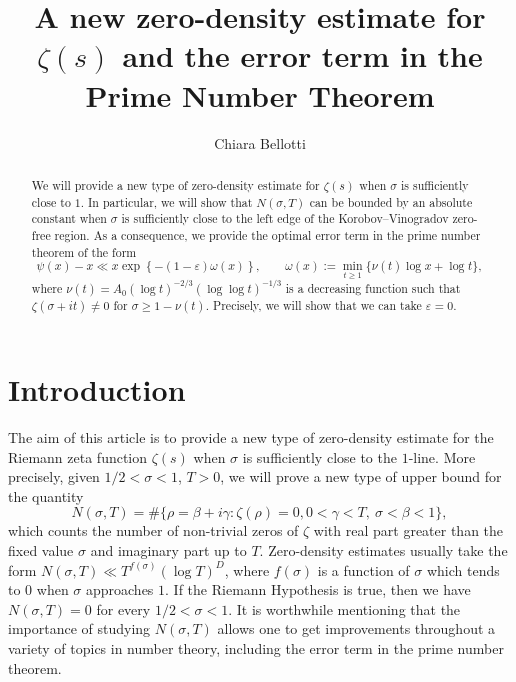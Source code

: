 \documentclass[reqno]{amsart}
\title[A new zero-density estimate and PNT]{A new zero-density estimate for $\zeta(s)$ and the error term in the Prime Number Theorem}
\author[C. Bellotti]{Chiara  Bellotti}
\numberwithin{equation}{section}
\theoremstyle{remark}
\begin{document}
\maketitle
\vspace{-2.5em}
\begin{abstract}
We will provide a new type of zero-density estimate for $\zeta(s)$ when $\sigma$ is sufficiently close to $1$. In particular, we will show that $N(\sigma,T)$ can be bounded by an absolute constant when $\sigma$ is sufficiently close to the left edge of the Korobov--Vinogradov zero-free region. As a consequence, we provide the optimal error term in the prime number theorem of the form 
$$
\psi(x)-x \ll x\exp \left\{-(1-\varepsilon) \omega(x)\right\},\qquad \omega(x):=\min _{t \geq 1}\{\nu(t) \log x+\log t\},
$$
where $\nu(t)=A_0(\log t)^{-2/3}(\log\log t)^{-1/3}$ is a decreasing function such that $\zeta(\sigma+it)\neq 0$ for $\sigma\ge 1-\nu(t)$. Precisely, we will show that we can take $\varepsilon=0$.
\end{abstract}
\section{Introduction}\label{section1}
The aim of this article is to provide a new type of zero-density estimate for the Riemann zeta function $\zeta(s)$ when $\sigma$ is sufficiently close to the $1$-line. More precisely, given $1/2<\sigma<1$, $T>0$, we will prove a new type of upper bound for the quantity$$
N(\sigma, T)=\#\{\rho=\beta+i \gamma: \zeta(\rho)=0,0<\gamma<T,\  \sigma<\beta<1\},
$$
which counts the number of non-trivial zeros of $\zeta$ with real part greater than the fixed value $\sigma$ and imaginary part up to $T$. Zero-density estimates usually take the form $N(\sigma,T)\ll T^{f(\sigma)}(\log T)^{D}$, where $f(\sigma)$ is a function of $\sigma$ which tends to $0$ when $\sigma$ approaches $1$. If the Riemann Hypothesis is true, then we have $N(\sigma,T)=0$ for every $1/2<\sigma<1$. It is worthwhile mentioning that the importance of studying $N(\sigma,T)$ allows one to get improvements throughout a variety of topics in number theory, including the error term in the prime number theorem.
\end{document}
